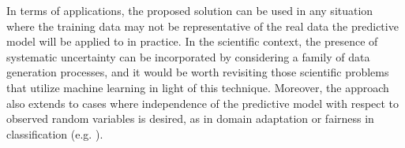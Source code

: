\documentclass{article}
\theoremstyle{plain}
\begin{document}

In terms of applications, the proposed solution can be used in any situation
where the training data may not be representative of the real data the
predictive model will be applied to in practice. In the scientific context, the
presence of systematic uncertainty can be incorporated by considering a family
of data generation processes, and it would be worth revisiting those scientific problems
that utilize machine learning in light of this technique. Moreover, the approach
also extends to cases where independence of the predictive model with respect to
observed random variables is desired, as in domain adaptation or fairness in
classification (e.g. \cite{Shimmin:2017mfk}).




\end{document}
